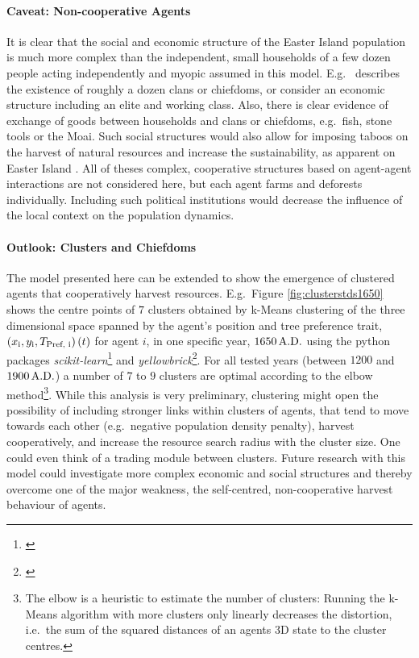 \paragraph{Caveat: Non-cooperative Agents}
It is clear that the social and economic structure of the Easter Island population is much more complex than the independent, small households of a few dozen people acting independently and myopic assumed in this model. 
E.g.\ \citet{Diamond2011} describes the existence of roughly a dozen clans or chiefdoms, or \citet{Puleston2017} consider an economic structure including an elite and working class.
Also, there is clear evidence of exchange of goods between households and clans or chiefdoms, e.g.\ fish, stone tools or the Moai.
Such social structures would also allow for imposing taboos on the harvest of natural resources and increase the sustainability, as apparent on Easter Island \citep{Good2006}. 
All of theses complex, cooperative structures based on agent-agent interactions are not considered here, but each agent farms and deforests individually.
Including such political institutions would decrease the influence of the local context on the population dynamics.

\paragraph{Outlook: Clusters and Chiefdoms}
The model presented here can be extended to show the emergence of clustered agents that cooperatively harvest resources.
E.g.\ Figure \ref{fig:clusterstds1650} shows the centre points of $7$ clusters obtained by k-Means clustering of the three dimensional space spanned by the agent's position and tree preference trait, $\left( x_{\rm i}, y_{\rm i}, T_\text{Pref, i} \right)(t)$ for agent $i$, in one specific year, $1650\, {\rm A.D.}$ using the python packages \textit{scikit-learn}\footnote{\citet{scikit-learn}} and \textit{yellowbrick}\footnote{\citet{yellowbrick}}.
For all tested years (between $1200$ and $1900\, {\rm A.D.}$) a number of $7$ to $9$ clusters are optimal according to the elbow method\footnote{The elbow is a heuristic to estimate the number of clusters:
	Running the k-Means algorithm with more clusters only linearly decreases the distortion, i.e.\ the sum of the squared distances of an agents 3D state to the cluster centres.}.
While this analysis is very preliminary, clustering might open the possibility of including stronger links within clusters of agents, that tend to move towards each other (e.g.\ negative population density penalty), harvest cooperatively, and increase the resource search radius with the cluster size.
One could even think of a trading module between clusters.
Future research with this model could investigate more complex economic and social structures and thereby overcome one of the major weakness, the self-centred, non-cooperative harvest behaviour of agents.


